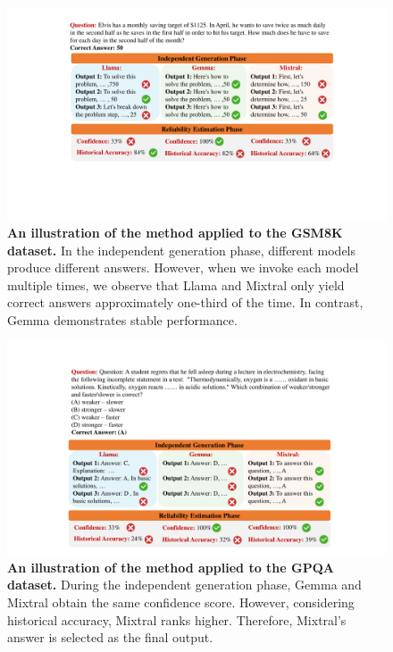 \begin{figure}[ht]
    \centering
    \includegraphics[width=0.7\linewidth]{Figures/example_2_cropped.pdf}
    \caption{\textbf{An illustration of the \NAME{} method applied to the GSM8K dataset.} In the independent generation phase, different models produce different answers. However, when we invoke each model multiple times, we observe that Llama and Mixtral only yield correct answers approximately one-third of the time. In contrast, Gemma demonstrates stable performance.}
    \label{fig:example_2}
\end{figure}

\begin{figure}[ht]
    \centering
    \includegraphics[width=0.7\linewidth]{Figures/example_3_cropped.pdf}
    \caption{\textbf{An illustration of the \NAME{} method applied to the GPQA dataset.} During the independent generation phase, Gemma and Mixtral obtain the same confidence score. However, considering historical accuracy, Mixtral ranks higher. Therefore, Mixtral's answer is selected as the final output.}
    \label{fig:example_3}
\end{figure}




